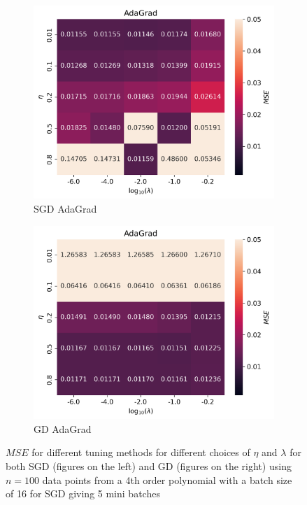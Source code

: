 \documentclass[11pt]{article}
\begin{document}
\begin{figure}[H]
\begin{subfigure}{.5\textwidth}
        \centering
        \includegraphics[width=\textwidth]{../figures/AdaGrad_SGD_eta_lmb.png}
        \caption{SGD AdaGrad}
        \label{fig:}
    \end{subfigure}
    \begin{subfigure}{.5\textwidth}
        \centering
        \includegraphics[width=\textwidth]{../figures/AdaGrad_GD_eta_lmb.png}
        \caption{GD AdaGrad}
        \label{fig:}
    \end{subfigure}
    \caption{$MSE$ for different tuning methods for different choices of $\eta$ and $\lambda$ for both SGD (figures on the left) and GD (figures on the right) using $n=100$ data points from a 4th order polynomial with a batch size of 16 for SGD giving 5 mini batches}
    \label{fig:compare_ridge_2}
\end{figure}
\end{document}
